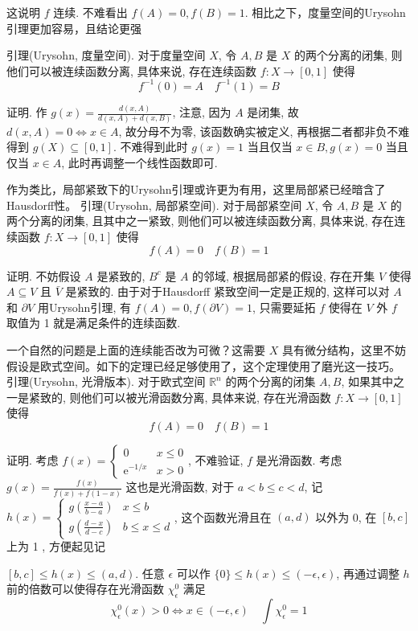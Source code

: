 \documentclass[options]{article}
\begin{document}
这说明 $f$ 连续. 不难看出 $f(A)=0, f(B)=1$.
相比之下，度量空间的Urysohn引理更加容易，且结论更强

引理(Urysohn, 度量空间). 对于度量空间 $X$, 令 $A, B$ 是 $X$ 的两个分离的闭集, 则他们可以被连续函数分离, 具体来说, 存在连续函数 $f: X \rightarrow[0,1]$ 使得
\[
f^{-1}(0)=A \quad f^{-1}(1)=B
\]

证明. 作 $g(x)=\frac{d(x, A)}{d(x, A)+d(x, B)}$, 注意, 因为 $A$ 是闭集, 故 $d(x, A)=0 \Longleftrightarrow x \in A$, 故分母不为零, 该函数确实被定义, 再根据二者都非负不难得到 $g(X) \subseteq[0,1]$. 不难得到此时 $g(x)=1$ 当且仅当 $x \in B, g(x)=0$ 当且仅当 $x \in A$, 此时再调整一个线性函数即可.

作为类比，局部紧致下的Urysohn引理或许更为有用，这里局部紧已经暗含了Hausdorff性。
引理(Urysohn, 局部紧空间). 对于局部紧空间 $X$, 令 $A, B$ 是 $X$ 的两个分离的闭集, 且其中之一紧致, 则他们可以被连续函数分离, 具体来说, 存在连续函数 $f: X \rightarrow[0,1]$ 使得
\[
f(A)=0 \quad f(B)=1
\]

证明. 不妨假设 $A$ 是紧致的, $B^c$ 是 $A$ 的邻域, 根据局部紧的假设, 存在开集 $V$ 使得 $A \subseteq V$ 且 $\bar{V}$ 是紧致的. 由于对于Hausdorff 紧致空间一定是正规的, 这样可以对 $A$ 和 $\partial V$ 用Urysohn引理, 有 $f(A)=0, f(\partial V)=1$, 只需要延拓 $f$ 使得在 $V$ 外 $f$ 取值为 1 就是满足条件的连续函数.

一个自然的问题是上面的连续能否改为可微？这需要 $X$ 具有微分结构，这里不妨假设是欧式空间。如下的定理已经足够使用了，这个定理使用了磨光这一技巧。
引理(Urysohn, 光滑版本). 对于欧式空间 $\mathbb{R}^n$ 的两个分离的闭集 $A, B$, 如果其中之一是紧致的, 则他们可以被光滑函数分离, 具体来说, 存在光滑函数 $f: X \rightarrow[0,1]$ 使得
\[
f(A)=0 \quad f(B)=1
\]

证明. 考虑 $f(x)=\left\{\begin{array}{ll}0 & x \leq 0 \\ \mathrm{e}^{-1 / x} & x>0\end{array}\right.$, 不难验证, $f$ 是光滑函数. 考虑 $g(x)=\frac{f(x)}{f(x)+f(1-x)}$ 这也是光滑函数, 对于 $a<b \leq c<d$, 记 $h(x)=\left\{\begin{array}{ll}g\left(\frac{x-a}{b-a}\right) & x \leq b \\ g\left(\frac{d-x}{d-c}\right) & b \leq x \leq d\end{array}\right.$, 这个函数光滑且在 $(a, d)$ 以外为 0, 在 $[b, c]$ 上为 1 , 方便起见记

$[b, c] \leq h(x) \leq(a, d)$. 任意 $\epsilon$ 可以作 $\{0\} \leq h(x) \leq(-\epsilon, \epsilon)$, 再通过调整 $h$ 前的倍数可以使得存在光滑函数 $\chi_\epsilon^0$ 满足
\[
\chi_\epsilon^0(x)>0 \Longleftrightarrow x \in(-\epsilon, \epsilon) \quad \int \chi_\epsilon^0=1
\]
\end{document}
